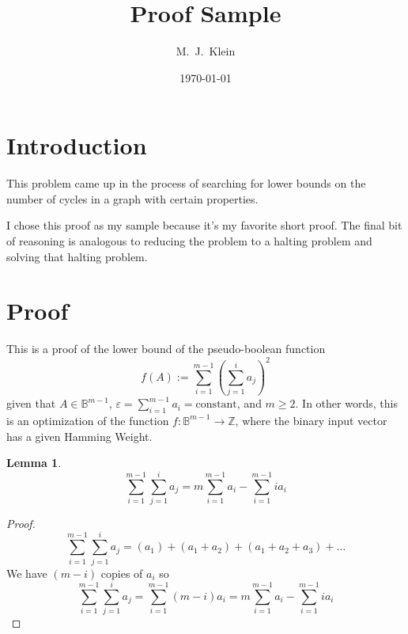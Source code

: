 \documentclass[12pt]{amsart}
\title{Proof Sample}
\author{M.~J.~Klein}
\date{\today}
\newtheorem{lemma}{Lemma}[section]
\begin{document}
\maketitle
\pagestyle{plain}

\section{Introduction}
	This problem came up in the process of searching for lower bounds on the number of cycles in a graph with certain properties.
	
	I chose this proof as my sample because it's my favorite short proof. The final bit of reasoning is analogous to reducing the problem to a halting problem and solving that halting problem. 
\section{Proof}

This is a proof of the lower bound of the pseudo-boolean function 
	$$f(A) := \sum_{i=1}^{m-1} \left( \sum_{j=1}^{i} a_j \right)^2$$ 
	given that $A \in \mathbb{B}^{m-1}$, $\varepsilon = \sum_{i=1}^{m-1} a_i = \text{constant}$, and $m \geq 2$. 
	In other words, this is an optimization of the function $f : \mathbb{B}^{m-1} \to \mathbb{Z}$, where the binary input vector has a given Hamming Weight.

\begin{lemma}
\label{lem10}
	$$\sum_{i = 1}^{m-1} \sum_{j=1}^{i} a_j = m \sum_{i = 1}^{m-1} a_i - \sum_{i = 1}^{m-1} i a_i$$
\end{lemma}
\begin{proof}
	$$\sum_{i = 1}^{m-1} \sum_{j=1}^{i} a_j = (a_1) + (a_1 + a_2) + (a_1 + a_2 + a_3) + \dots$$
	We have $(m-i)$ copies of $a_i$ so \\
	$$\sum_{i = 1}^{m-1} \sum_{j=1}^{i} a_j = \sum_{i = 1}^{m-1} (m - i) a_i = m \sum_{i = 1}^{m-1} a_i - \sum_{i = 1}^{m-1} i a_i$$
\end{proof}
\end{document}
